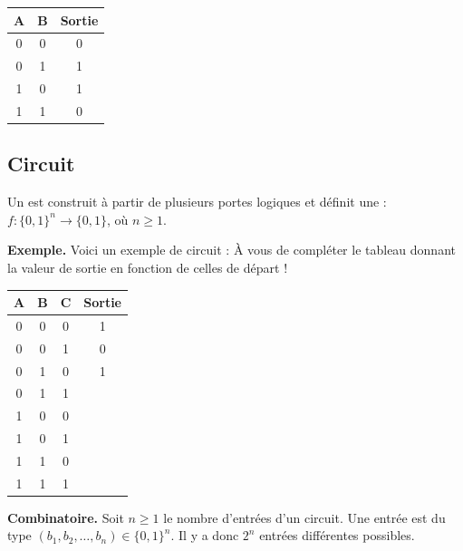 \documentclass[11pt,class=report,crop=false]{standalone}
\begin{document}
\begin{center}
\begin{minipage}{0.45\textwidth}
\begin{center}
\begin{tabular}{|c|c|c|}
\hline
A & B & Sortie \\ \hline\hline
0 & 0 & 0 \\
0 & 1 & 1 \\
1 & 0 & 1 \\
1 & 1 & 0 \\ \hline
\end{tabular}
\end{center}
\end{minipage}
\begin{minipage}{0.45\textwidth}
\end{minipage}
\end{center}

\subsection{Circuit}


Un  est construit à partir de plusieurs portes logiques et définit une  :
$f : \{0,1\}^n \to \{0,1\}$, où $n\ge1$.

\textbf{Exemple.}
Voici un exemple de circuit :
À vous de compléter le tableau donnant la valeur de sortie en fonction de celles de départ !
\begin{center}
\begin{tabular}{|c|c|c|c|}
\hline
A & B & C & Sortie \\ \hline\hline
0 & 0 & 0 & 1 \\
0 & 0 & 1 & 0 \\
0 & 1 & 0 & 1 \\
0 & 1 & 1 &  \\
1 & 0 & 0 &  \\
1 & 0 & 1 &  \\
1 & 1 & 0 &  \\
1 & 1 & 1 &  \\ \hline
\end{tabular}
\end{center}


\textbf{Combinatoire.}
Soit $n\ge1$ le nombre d'entrées d'un circuit.
Une entrée est du type $(b_1,b_2,\ldots,b_n) \in \{0,1\}^n$. 
Il y a donc $2^n$ entrées différentes possibles.
\end{document}
